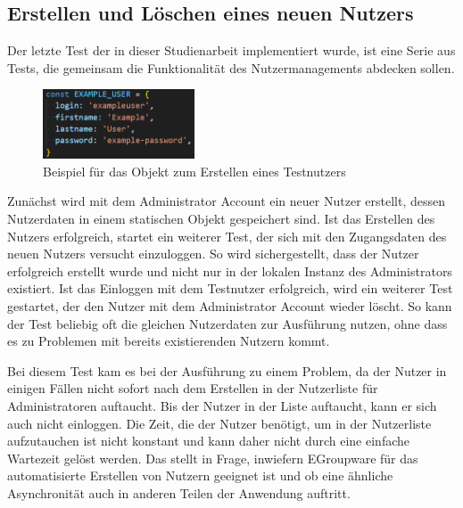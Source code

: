 \newpage
\subsection*{Erstellen und Löschen eines neuen Nutzers}

Der letzte Test der in dieser Studienarbeit implementiert wurde, ist eine Serie aus Tests, die gemeinsam die Funktionalität des Nutzermanagements abdecken sollen.
\begin{figure}[H]
    \centering
    \includegraphics[width=0.4\textwidth]{images/Exampleuser.png}
    \caption{Beispiel für das Objekt zum Erstellen eines Testnutzers}
    \label{fig:example-user}
\end{figure}
Zunächst wird mit dem Administrator Account ein neuer Nutzer erstellt, dessen Nutzerdaten in einem statischen Objekt gespeichert sind.
Ist das Erstellen des Nutzers erfolgreich, startet ein weiterer Test, der sich mit den Zugangsdaten des neuen Nutzers versucht einzuloggen.
So wird sichergestellt, dass der Nutzer erfolgreich erstellt wurde und nicht nur in der lokalen Instanz des Administrators existiert.
Ist das Einloggen mit dem Testnutzer erfolgreich, wird ein weiterer Test gestartet, der den Nutzer mit dem Administrator Account wieder löscht.
So kann der Test beliebig oft die gleichen Nutzerdaten zur Ausführung nutzen, ohne dass es zu Problemen mit bereits existierenden Nutzern kommt.

Bei diesem Test kam es bei der Ausführung zu einem Problem, da der Nutzer in einigen Fällen nicht sofort nach dem Erstellen in der Nutzerliste für Administratoren auftaucht.
Bis der Nutzer in der Liste auftaucht, kann er sich auch nicht einloggen.
Die Zeit, die der Nutzer benötigt, um in der Nutzerliste aufzutauchen ist nicht konstant und kann daher nicht durch eine einfache Wartezeit gelöst werden.
Das stellt in Frage, inwiefern EGroupware für das automatisierte Erstellen von Nutzern geeignet ist und ob eine ähnliche Asynchronität auch in anderen Teilen der Anwendung auftritt.
